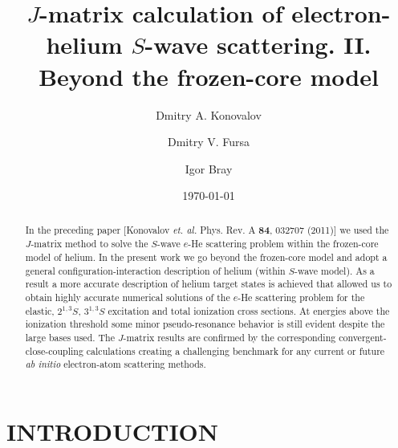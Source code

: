 \documentclass[aip
, pra
, showpacs
, aps
, twocolumn
, groupedaddress
, floatfix
]{revtex4}
\begin{document}
\title {$J$-matrix calculation of electron-helium $S$-wave scattering. II. Beyond the frozen-core model}

\author{Dmitry A. Konovalov}

\author{Dmitry V. Fursa}

\author{Igor Bray}



\date{\today}

\begin{abstract}
In the preceding paper  [Konovalov {\em et. al.} Phys. Rev. A {\bf 84}, 032707 (2011)] we used
the $J$-matrix method to solve  the $S$-wave $e$-He scattering problem within the frozen-core model of helium.
In the present work we go beyond the frozen-core model and adopt a general configuration-interaction description of helium (within $S$-wave model).
As a result a more accurate description of helium target states is achieved that allowed us to obtain highly
accurate numerical solutions of the $e$-He scattering problem
for the elastic, $2^{1,3}S$, $3^{1,3}S$ excitation and total ionization cross sections.
At energies above the ionization threshold some minor pseudo-resonance behavior is still evident despite the large bases used.
The $J$-matrix results are confirmed by the corresponding convergent-close-coupling calculations creating a challenging benchmark
for any current or future {\it ab initio} electron-atom scattering methods.



\end{abstract}

\maketitle



\section{INTRODUCTION}
\end{document}
